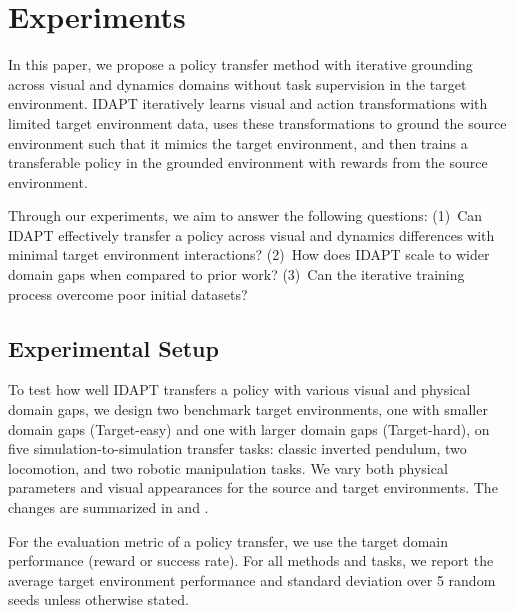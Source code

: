 \section{Experiments}

In this paper, we propose a policy transfer method with iterative grounding across visual and dynamics domains without task supervision in the target environment. IDAPT iteratively learns visual and action transformations with limited target environment data, uses these transformations to ground the source environment such that it mimics the target environment, and then trains a transferable policy in the grounded environment with rewards from the source environment.

Through our experiments, we aim to answer the following questions: (1)~Can IDAPT effectively transfer a policy across visual and dynamics differences with minimal target environment interactions? (2)~How does IDAPT scale to wider domain gaps when compared to prior work?  (3)~Can the iterative training process overcome poor initial datasets?


\subsection{Experimental Setup}

To test how well IDAPT transfers a policy with various visual and physical domain gaps, we design two benchmark target environments, one with smaller domain gaps (Target-easy) and one with larger domain gaps (Target-hard), on five simulation-to-simulation transfer tasks: classic inverted pendulum, two locomotion, and two robotic manipulation tasks. We vary both physical parameters and visual appearances for the source and target environments.  The changes are summarized in  and .  

For the evaluation metric of a policy transfer, we use the target domain performance (reward or success rate).  For all methods and tasks, we report the average target environment performance and standard deviation over 5 random seeds unless otherwise stated.



